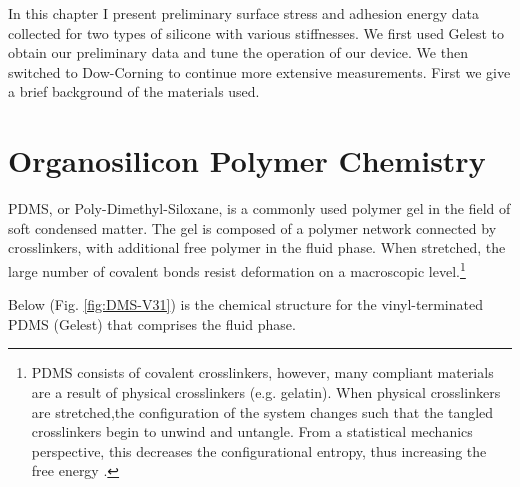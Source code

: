In this chapter I present preliminary surface stress and adhesion energy data collected for two types of silicone with various stiffnesses. We first used Gelest to obtain our preliminary data and tune the operation of our device. We then switched to Dow-Corning to continue more extensive measurements. First we give a brief background of the materials used. 


\section{Organosilicon Polymer Chemistry}
\label{section:polychem}
PDMS, or Poly-Dimethyl-Siloxane, is a commonly used polymer gel in the field of soft condensed matter. The gel is composed of a polymer network connected by crosslinkers, with additional free polymer in the fluid phase. When stretched, the large number of covalent bonds resist deformation on a macroscopic level.\footnote{PDMS consists of covalent crosslinkers, however, many compliant materials are a result of physical crosslinkers (e.g. gelatin). When physical crosslinkers are stretched,the configuration of the system changes such that the tangled crosslinkers begin to unwind and untangle. From a statistical mechanics perspective, this decreases the configurational entropy, thus increasing the free energy \cite{Andreotti2020}.} 


Below (Fig. \ref{fig:DMS-V31}) is the chemical structure for the vinyl-terminated PDMS (Gelest) that comprises the fluid phase. 
\setatomsep{20pt}

\newcommand\setpolymerdelim[2]{\def\delimleft{#1}\def\delimright{#2}}
\def\makebraces(#1,#2)#3#4#5{%
	\edef\delimhalfdim{\the\dimexpr(#1+#2)/2}%
	\edef\delimvshift{\the\dimexpr(#1-#2)/2}%
	\chemmove{
		\node[at=(#4),yshift=(\delimvshift)]
		{$
			\left\delimleft
			\vrule height\delimhalfdim depth\delimhalfdim width0pt
			\right.
			$};
		\node[at=(#5),yshift=(\delimvshift)]
		{$
			\left.
			\vrule height\delimhalfdim depth\delimhalfdim width0pt
			\right\delimright_{\rlap{#3}}
			$};
	}%
}

